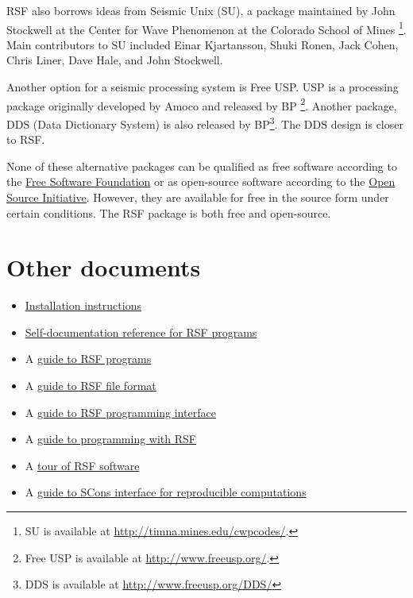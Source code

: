 RSF also borrows ideas from Seismic Unix (SU), a package maintained by John
Stockwell at the Center for Wave Phenomenon at the Colorado School of Mines
\cite[]{TLE16-07-10451049,su}\footnote{SU is available at
  \url{http://timna.mines.edu/cwpcodes/}.}. Main contributors to SU
included Einar Kjartansson, Shuki Ronen, Jack Cohen, Chris Liner, Dave Hale,
and John Stockwell.

Another option for a seismic processing system is Free USP. USP is a
processing package originally developed by Amoco and released by BP
\footnote{Free USP is available at
\url{http://www.freeusp.org/}.}. Another package, DDS (Data Dictionary
System) is also released by BP\footnote{DDS is available at
\url{http://www.freeusp.org/DDS/}}. The DDS design is closer to RSF.

None of these alternative packages can be qualified as free software
according to the
\href{http://www.fsf.org/philosophy/free-sw.html}{Free Software
Foundation} or as open-source software according to the
\href{http://www.opensource.org/docs/definition.php}{Open Source
Initiative}.  However, they are available for free in the source form
under certain conditions. The RSF package is both free and
open-source.

\section{Other documents}

\begin{itemize}
\item
  \href{http://egl.beg.utexas.edu/RSF/book/rsf/rsf/install_html/}{Installation instructions}
\item \href{http://egl.beg.utexas.edu/RSF/}{Self-documentation reference for RSF programs}
\item A \href{http://egl.beg.utexas.edu/RSF/book/rsf/rsf/prog_html/}{guide to RSF programs}
\item A \href{http://egl.beg.utexas.edu/RSF/book/rsf/rsf/format_html/}
  {guide to RSF file format}
\item A \href{http://egl.beg.utexas.edu/RSF/book/rsf/rsf/api_html/}{guide to
    RSF programming interface}
\item A \href{http://egl.beg.utexas.edu/RSF/book/rsf/rsf/demo_html/}{guide to programming with RSF}
\item A \href{http://egl.beg.utexas.edu/RSF/book/rsf/rsf/tour_html/}{tour of RSF software}
\item A
  \href{http://egl.beg.utexas.edu/RSF/book/rsf/scons/paper_html/}{guide
    to SCons interface for reproducible computations}
\end{itemize}




%


